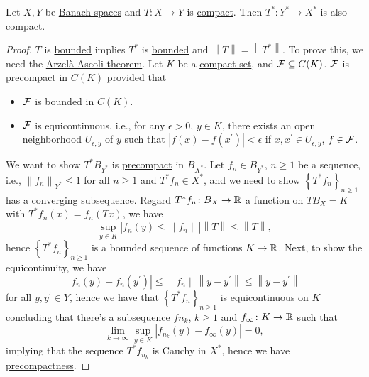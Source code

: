 \begin{theorem}
	Let \(X, Y\) be \hyperref[def:Banach-space]{Banach spaces} and \(T\colon X\to Y\) is \hyperref[def:compact-op]{compact}. Then \(T^{\ast} \colon Y^{\ast} \to X^{\ast} \) is also \hyperref[def:compact-op]{compact}.
\end{theorem}
\begin{proof}
	\(T\) is \hyperref[def:bounded-map]{bounded} implies \(T^{\ast} \) is \hyperref[def:bounded-map]{bounded} and \(\left\lVert T\right\rVert = \left\lVert T^{\ast} \right\rVert \). To prove this, we need the \href{https://en.wikipedia.org/wiki/Arzel%C3%A0%E2%80%93Ascoli_theorem}{Arzelà-Ascoli theorem}. Let \(K\) be a \hyperref[def:compact]{compact set}, and \(\mathcal{\MakeUppercase{f}} \subseteq C(K)\). \(\mathcal{\MakeUppercase{f}} \) is \hyperref[def:precompact]{precompact} in \(C(K)\) provided that 
	\begin{itemize}
		\item \(\mathcal{\MakeUppercase{f}} \) is bounded in \(C(K)\).
		\item \(\mathcal{\MakeUppercase{f}} \) is equicontinuous, i.e., for any \(\epsilon >0\), \(y\in K\), there exists an open neighborhood \(U_{\epsilon , y}\) of \(y\) such that \(\left\vert f(x) - f(x^\prime ) \right\vert< \epsilon \) if \(x, x^\prime \in U_{\epsilon , y}\), \(f\in \mathcal{\MakeUppercase{f}} \).
	\end{itemize}
	We want to show \(T^{\ast} B_{Y^{\ast} }\) is \hyperref[def:precompact]{precompact} in \(B_{X^{\ast} }\). Let \(f_{n} \in B_{Y^{\ast} }\), \(n \geq 1\) be a sequence, i.e., \(\left\lVert f_n \right\rVert _{Y^{\ast} } \leq 1\) for all \(n\geq 1\) and \(T^{\ast} f_{n} \in X^{\ast} \), and we need to show \(\left\{ T^{\ast} f_n \right\}_{n\geq 1} \) has a converging subsequence. Regard \(T^{\ast} f_{n} \colon B_X \to \mathbb{\MakeUppercase{r}} \) a function on \(\overline{TB_{X} } = K\) with \(T^{\ast} f_{n} (x) = f_{n} (Tx)\), we have
	\[
		\sup _{y\in K} \left\vert f_{n} (y)\leq \left\lVert f_{n} \right\rVert  \right\vert \left\lVert T\right\rVert \leq \left\lVert T\right\rVert,
	\]
	hence \(\left\{ T^{\ast} f_{n}  \right\}_{n\geq 1} \) is a bounded sequence of functions \(K\to \mathbb{\MakeUppercase{r}} \). Next, to show the equicontinuity, we have
	\[
		\left\vert f_{n} (y) - f_{n} (y^\prime ) \right\vert
		\leq \left\lVert f_{n} \right\rVert \left\lVert y-y^\prime \right\rVert
		\leq \left\lVert y - y^\prime \right\rVert
	\]
	for all \(y, y^\prime \in Y\), hence we have that \(\left\{ T^{\ast} f_{n}  \right\}_{n\geq 1} \) is equicontinuous on \(K\) concluding that there's a subsequence \(f{n_{k} }\), \(k \geq 1\) and \(f_{\infty }\colon K\to \mathbb{\MakeUppercase{r}} \) such that
	\[
		\lim_{k \to \infty} \sup _{y\in K}\left\vert f_{n_{k} } (y) - f_\infty (y) \right\vert = 0 ,
	\]
	implying that the sequence \(T^{\ast} f_{n_{k} }\) is Cauchy in \(X^{\ast} \), hence we have \hyperref[def:precompact]{precompactness}.
\end{proof}